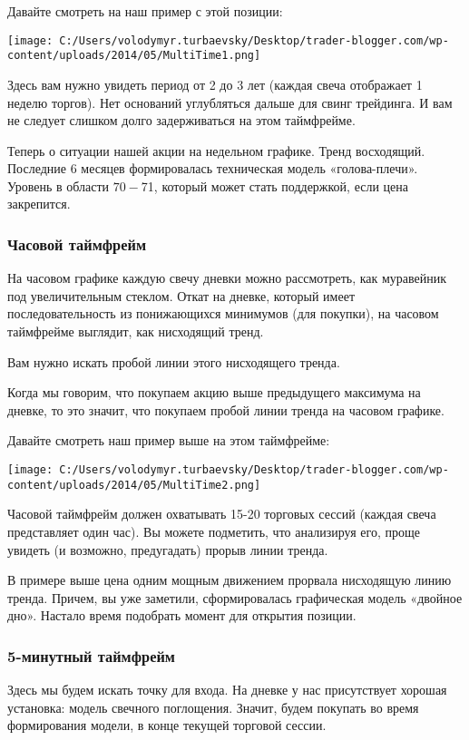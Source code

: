 \documentclass[a5paper]{article}
\begin{document}
Давайте смотреть на наш пример с этой позиции:

\texttt{[image: C:/Users/volodymyr.turbaevsky/Desktop/trader-blogger.com/wp-content/uploads/2014/05/MultiTime1.png]}

Здесь вам нужно увидеть период от 2 до 3 лет (каждая свеча отображает 1 неделю торгов). Нет оснований углубляться дальше для свинг трейдинга. И вам не следует слишком долго задерживаться на этом таймфрейме.

Теперь о ситуации нашей акции на недельном графике. Тренд
восходящий. Последние 6 месяцев формировалась техническая модель
«голова-плечи». Уровень в области $70-$71, который может стать
поддержкой, если цена закрепится.

\subsubsection{Часовой таймфрейм}

На часовом графике каждую свечу дневки можно рассмотреть, как муравейник под увеличительным стеклом. Откат на дневке, который имеет последовательность из понижающихся минимумов (для покупки), на часовом таймфрейме выглядит, как нисходящий тренд.

Вам нужно искать пробой линии этого нисходящего тренда.

Когда мы говорим, что покупаем акцию выше предыдущего максимума на дневке, то это значит, что покупаем пробой линии тренда на часовом графике.

Давайте смотреть наш пример выше на этом таймфрейме:

\texttt{[image: C:/Users/volodymyr.turbaevsky/Desktop/trader-blogger.com/wp-content/uploads/2014/05/MultiTime2.png]}

Часовой таймфрейм должен охватывать 15-20 торговых сессий (каждая свеча представляет один час).  Вы можете подметить, что анализируя его, проще увидеть (и возможно, предугадать) прорыв линии тренда.

В примере выше цена одним мощным движением прорвала нисходящую линию
тренда. Причем, вы уже заметили, сформировалась графическая модель
«двойное дно». Настало время подобрать момент для открытия позиции.

\subsubsection{5-минутный таймфрейм}

Здесь мы будем искать точку для входа. На дневке у нас присутствует хорошая установка: модель свечного поглощения. Значит, будем покупать во время формирования модели, в конце текущей торговой сессии.
\end{document}
